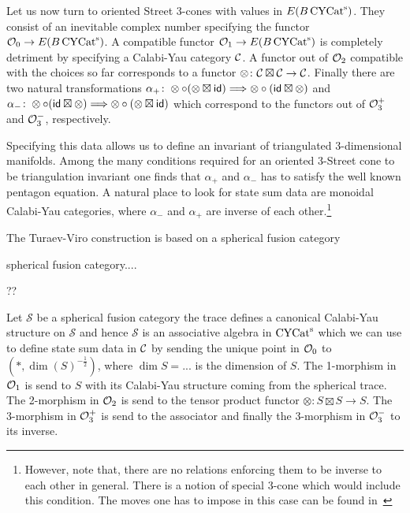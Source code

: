 Let us now turn to oriented Street 3-cones with values in $E(B\operatorname{\mathrm{CYCat}^s})$. They consist of an inevitable complex number specifying the functor $\mathcal{O}_0 \to E(B\operatorname{\mathrm{CYCat}^s})$. A compatible functor $\mathcal{O}_1 \to E(B\operatorname{\mathrm{CYCat}^s})$ is completely detriment by specifying a Calabi-Yau category $\mathcal{C}$. A functor out of $\mathcal{O}_2$ compatible with the choices so far corresponds to a functor $\otimes \colon \mathcal{C} \boxtimes \mathcal{C} \to \mathcal{C}$. Finally there are two natural transformations $\alpha_+\colon \otimes \circ (\otimes \boxtimes \mathsf{id} ) \Longrightarrow \otimes \circ (\mathsf{id} \boxtimes \otimes )$ and $\alpha_-\colon \otimes \circ (\mathsf{id} \boxtimes \otimes ) \Longrightarrow \otimes \circ (\otimes \boxtimes \mathsf{id} )$ which correspond to the functors out of $\mathcal{O}_3^+$ and $\mathcal{O}_3^-$, respectively.    

Specifying this data allows us to define an invariant of triangulated 3-dimensional manifolds. Among the many conditions required for an oriented 3-Street cone to be triangulation invariant one finds that $\alpha_+$ and $\alpha_-$ has to satisfy the well known pentagon equation. A natural place to look for state sum data are monoidal Calabi-Yau categories, where $\alpha_-$ and $\alpha_+$ are inverse of each other.\footnote{However, note that, there are no relations enforcing them to be inverse to each other in general. There is a notion of special 3-cone which would include this condition. The moves one has to impose in this case can be found in~\cite[Section 3.4]{carqueville2016orbifoldcompletion}}  

The Turaev-Viro construction is based on a spherical fusion category
\begin{definition}
    spherical fusion category....
\end{definition}
\begin{example}
    ??
\end{example}
Let $\mathcal{S}$ be a spherical fusion category the trace defines a canonical Calabi-Yau structure on $\mathcal{S}$ and hence $\mathcal{S}$ is an associative algebra in $\operatorname{\mathrm{CYCat}^s}$ which we can use to define state sum data in $\mathcal{C}$ by sending the unique point in $\mathcal{O}_0$ to $(*,\dim (S)^{-\tfrac{1}{2}})$, where $\dim S = ...$ is the dimension of $S$. The 1-morphism in $\mathcal{O}_1$ is send to $S$ with its Calabi-Yau structure coming from the spherical trace. The 2-morphism in $\mathcal{O}_2$ is send to the tensor product functor $\otimes \colon S\boxtimes S \to S$. The 3-morphism in $\mathcal{O}_3^+$ is send to the associator and finally the 3-morphism in $\mathcal{O}_3^-$ to its inverse.